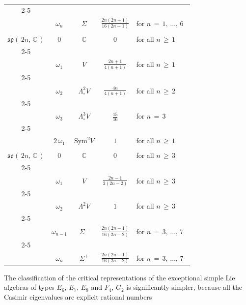\documentclass[12pt]{article}
\def\C{\mathbb{C}}
\def\L{\Lambda}
\def\S{\mathrm{Sym}}
\def\so{\mathfrak{so}}
\def\sp{\mathfrak{sp}}
\def\Z{\Sigma}
\begin{document}
\begin{center}
\begin{tabular}{| c | c | c | c | l |}
   \cline{2-5}&&&&
   \\[-10pt]
   & $\omega_n$ & $\Z$ & $\frac{2n(2n+1)}{16(2n-1)}$ &
   \quad for $n\,=\,1,\,\ldots,\,6$\quad\
   \\[3pt]
   \hline\hline&&&&
   \\[-10pt]
   $\sp(\,2n,\,\C\,)$ & $0$ & $\C$ & $0$ &
   \quad for all $n\,\geq\,1$
   \\[3pt]
   \cline{2-5}&&&&
   \\[-10pt]
   & $\omega_1$ & $V$ & $\frac{2n+1}{4(n+1)}$ &
   \quad for all $n\,\geq\,1$
   \\[3pt]
   \cline{2-5}&&&&
   \\[-10pt]
   & $\omega_2$ & $\L^2_\circ V$ & $\frac{4n}{4(n+1)}$ &
   \quad for all $n\,\geq\,2$
   \\[3pt]
   \cline{2-5}&&&&
   \\[-10pt]
   & $\omega_3$ & $\L^3_\circ V$ & $\frac{15}{16}$ &
   \quad for $n\,=\,3$\quad\ 
   \\[3pt]
   \cline{2-5}&&&&
   \\[-10pt]
   & $2\,\omega_1$ & $\S^2V$ & $1$ &
   \quad for all $n\,\geq\,1$
   \\[3pt]
   \hline\hline&&&&
   \\[-10pt]
   $\so(\,2n,\,\C\,)$ & $0$ & $\C$ & $0$ &
   \quad for all $n\,\geq\,3$
   \\[3pt]
   \cline{2-5}&&&&
   \\[-10pt]
   & $\omega_1$ & $V$ & $\frac{2n-1}{2(2n-2)}$ &
   \quad for all $n\,\geq\,3$
   \\[3pt]
   \cline{2-5}&&&&
   \\[-10pt]
   & $\omega_2$ & $\L^2V$ & $1$ &
   \quad for all $n\,\geq\,3$
   \\[3pt]
   \cline{2-5}&&&&
   \\[-10pt]
   & $\omega_{n-1} $ & $\Z^-$ & $\frac{2n(2n-1)}{16(2n-2)}$ &
   \quad for $n\,=\,3,\,\ldots,\,7$\quad\ 
   \\[3pt]
   \cline{2-5}&&&&
   \\[-10pt]
   & $\omega_n $ & $\Z^+$ & $\frac{2n(2n-1)}{16(2n-2)}$ &
   \quad for $n\,=\,3,\,\ldots,\,7$\quad\ 
   \\[3pt]
   \hline
  \end{tabular}
 \end{center}
 The classification of the critical representations of the exceptional simple
 Lie algebras of types $E_6,\,E_7,\,E_8$ and $F_4,\,G_2$ is significantly
 simpler, because all the Casimir eigenvalues are explicit rational numbers
\end{document}
